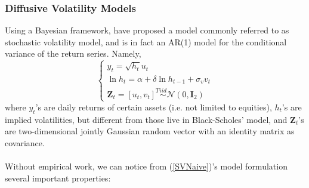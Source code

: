 \documentclass[letterpaper]{article}
\newcommand{\ZZ}{\mathbf{Z}}
\begin{document}
\subsubsection{Diffusive Volatility Models}
Using a Bayesian framework, \citet{rossi1994bayesian} have proposed a model commonly referred to as stochastic volatility model, and is in fact an AR(1) model for the conditional variance of the return series. Namely,
\begin{equation}\label{SVNaive}
	\begin{cases}
	y_t=\sqrt{h_t}u_t\\
	\ln h_t=\alpha+\delta\ln h_{t-1}+\sigma_v v_t\\
	\ZZ_t=[u_t,v_t]^{T}\stackrel{iid}{\sim}\mathcal{N}(0,\mathbf{I}_2)
	\end{cases}
\end{equation}
where $y_t$'s are daily returns of certain assets (i.e. not limited to equities), $h_t$'s are implied volatilities, but different from those live in Black-Scholes' model, and $\ZZ_t$'s are two-dimensional jointly Gaussian random vector with an identity matrix as covariance.\\\\
Without empirical work, we can notice from (\ref{SVNaive})'s model formulation several important properties:
\end{document}
